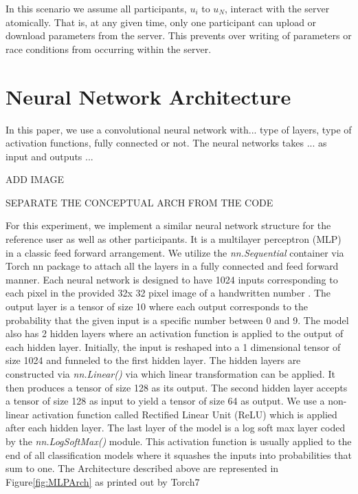 \documentclass[conference]{IEEEtran}
\begin{document}
In this scenario we assume all participants, $u_i$ to $u_N$, interact with the server atomically.
That is, at any given time, only one participant can upload or download parameters from the server. This prevents over writing of parameters or race conditions from occurring within the server.

\section{Neural Network Architecture}

In this paper, we use a convolutional neural network with... type of layers, type of activation functions, fully connected or not.  The
neural networks takes ... as input and outputs ...

ADD IMAGE 

SEPARATE THE CONCEPTUAL ARCH FROM THE CODE

For this experiment, we implement a similar neural network structure for the reference user as well as other participants. It is a
multilayer perceptron (MLP) in a classic feed forward arrangement. We utilize the \textit{nn.Sequential} container via Torch nn package
to attach all the layers in a fully connected and feed forward manner. Each neural network is designed to have 1024 inputs
corresponding to each pixel in the provided 32x 32 pixel image of a handwritten number \cite{deng2012mnist}. The output layer is a
tensor of size 10 where each output corresponds to the probability that the given input is a specific number between 0 and 9. The model
also has 2 hidden layers where an activation function is applied to the output of each hidden layer.
Initially, the input is reshaped into a 1 dimensional tensor of size 1024 and funneled to the first hidden layer. The hidden layers are constructed via \textit{nn.Linear()} via which linear transformation can be applied. It then produces a tensor of size 128 as its output. The second hidden layer accepts a tensor of size 128 as input to yield a tensor of size 64 as output. We use a non-linear activation function called Rectified Linear Unit (ReLU) which is applied after each hidden layer. The last layer of the model is a log soft max layer coded by the \textit{nn.LogSoftMax()} module.  This activation function is usually applied to the end of all classification models where it squashes the inputs into probabilities that sum to one.
The Architecture described above are represented in Figure\ref{fig:MLPArch} as printed out by Torch7
   
\end{document}
